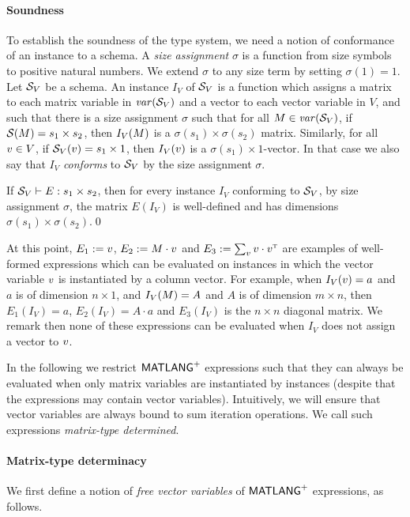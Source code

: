 \paragraph{Soundness}
To establish the soundness of the type system,
we need a notion of conformance of an instance to a schema. A \emph{size assignment} $\sigma$ is a function
from size symbols to positive natural numbers.  We extend
$\sigma$ to any size term by setting $\sigma(1) = 1$.  
Let $\mathcal{S}_V$ be a schema. An instance $I_V$ of $\mathcal{S}_V$ is a
function which assigns a matrix to each matrix variable in $\operatorname{\mathit{var}}(\mathcal{S}_V)$ and a vector to each vector variable in $V$,
and such that there is a size assignment $\sigma$ such
that for all $M \in \operatorname{\mathit{var}}(\mathcal{S}_V)$, if $\mathcal{S}(M) = s_1 \times s_2$,
then $I_V(M)$ is a $\sigma(s_1) \times \sigma(s_2)$ matrix.  Similarly,
for all $v\in V$, if $\mathcal{S}_V(v)=s_1\times 1$, then $I_V(v)$ is a
$\sigma(s_1)\times 1$-vector.
In
that case we also say that $I_V$
\emph{conforms} to $\mathcal{S}_V$ by the size assignment $\sigma$.

\begin{proposition}[Safety]
If $\mathcal{S}_V \vdash E : s_1 \times s_2$, then for every instance $I_V$
conforming to $\mathcal{S}_V$, by size assignment $\sigma$, the
matrix $E(I_V)$ is well-defined and has dimensions
$\sigma(s_1) \times \sigma(s_2)$.\qed
\end{proposition}

\begin{example}
At this point, $E_1:=v$,  $E_2:=M\cdot v$ and $E_3:=\sum_{v} v\cdot v^{\textsc{t}}$ are examples of well-formed expressions
which can be evaluated on instances in which the vector variable $v$ is instantiated by a column vector. For example,
when $I_V(v)=a$ and $a$ is of dimension $n\times 1$, and $I_V(M)=A$ and $A$ is of dimension $m\times n$, then
$E_1(I_V)=a$, $E_2(I_V)=A\cdot a$ and $E_3(I_V)$ is the $n\times n$ diagonal matrix. We remark then none of these expressions can be evaluated when $I_V$ does not assign a vector to $v$.
\end{example}


In the following we restrict $\mathsf{MATLANG}^{\sf +}$ expressions such that they can always be evaluated
when only matrix variables are instantiated by instances (despite that the expressions may contain vector variables). Intuitively, we will 
ensure that vector variables are always bound to sum iteration operations. We call such expressions \textit{matrix-type determined}.


\paragraph{Matrix-type determinacy}
We first define a notion of \textit{free vector variables} of $\mathsf{MATLANG}^{\sf +}$ expressions, as follows.


